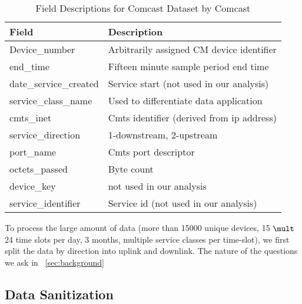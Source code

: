 \begin{table}[ht]
\small
\begin{tabular}{|l|l|}
\hline
\textbf{Field}         & \textbf{Description}                      \\ \hline
Device\_number         & Arbitrarily assigned CM device identifier \\ \hline
end\_time              & Fifteen minute sample period end time     \\ \hline
date\_service\_created & Service start (not used in our analysis)  \\ \hline
service\_class\_name   & Used to differentiate data application    \\ \hline
cmts\_inet             & Cmts identifier (derived from ip address) \\ \hline
service\_direction     & 1-downstream, 2-upstream                  \\ \hline
port\_name             & Cmts port descriptor                      \\ \hline
octets\_passed         & Byte count                                \\ \hline
device\_key            & not used in our analysis                  \\ \hline
service\_identifier    & Service id (not used in our analysis)     \\ \hline
\end{tabular}
\caption{Field Descriptions for Comcast Dataset by Comcast}
\label{tab:field-description}
\end{table}

To process the large amount of data (more than 15000 unique devices, 15 $\mult$ 24 time slots per day, 3 months, multiple service classes per time-slot), we first split the data by direction into uplink and downlink. The nature of the questions we ask in ~\ref{sec:background}



\subsection{Data Sanitization}






